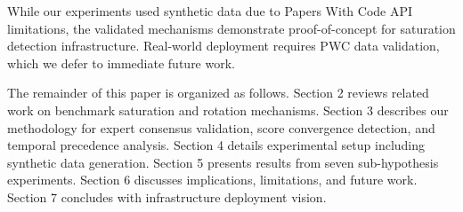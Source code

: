 While our experiments used synthetic data due to Papers With Code API limitations, the validated mechanisms demonstrate proof-of-concept for saturation detection infrastructure. Real-world deployment requires PWC data validation, which we defer to immediate future work.

The remainder of this paper is organized as follows. Section 2 reviews related work on benchmark saturation and rotation mechanisms. Section 3 describes our methodology for expert consensus validation, score convergence detection, and temporal precedence analysis. Section 4 details experimental setup including synthetic data generation. Section 5 presents results from seven sub-hypothesis experiments. Section 6 discusses implications, limitations, and future work. Section 7 concludes with infrastructure deployment vision.
